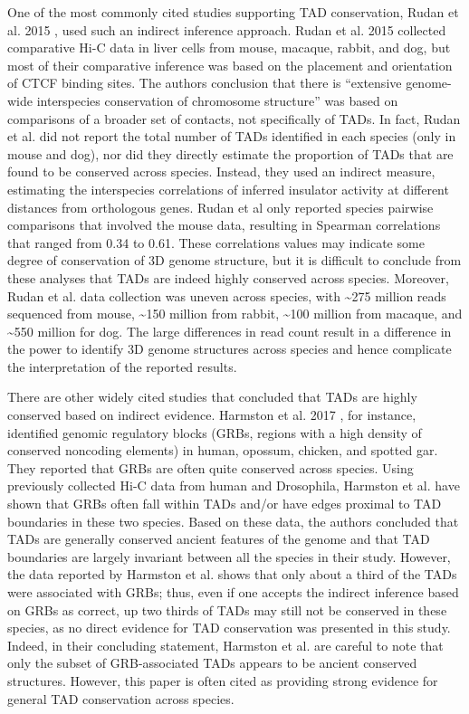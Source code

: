 One of the most commonly cited studies supporting TAD conservation, Rudan et al. 2015 \cite{Rudan.2015}, used such an indirect inference approach. Rudan et al. 2015 \cite{Rudan.2015} collected comparative Hi-C data in liver cells from mouse, macaque, rabbit, and dog, but most of their comparative inference was based on the placement and orientation of CTCF binding sites. The authors conclusion that there is ``extensive genome-wide interspecies conservation of chromosome structure'' was based on comparisons of a broader set of contacts, not specifically of TADs. In fact, Rudan et al. did not report the total number of TADs identified in each species (only in mouse and dog), nor did they directly estimate the proportion of TADs that are found to be conserved across species. Instead, they used an indirect measure, estimating the interspecies correlations of inferred insulator activity \cite{Sofueva.2013} at different distances from orthologous genes. Rudan et al only reported species pairwise comparisons that involved the mouse data, resulting in Spearman correlations that ranged from 0.34 to 0.61. These correlations values may indicate some degree of conservation of 3D genome structure, but it is difficult to conclude from these analyses that TADs are indeed highly conserved across species. Moreover, Rudan et al. data collection was uneven across species, with \textasciitilde{}275 million reads sequenced from mouse, \textasciitilde{}150 million from rabbit, \textasciitilde{}100 million from macaque, and \textasciitilde{}550 million for dog. The large differences in read count result in a difference in the power to identify 3D genome structures across species and hence complicate the interpretation of the reported results. 

There are other widely cited studies that concluded that TADs are highly conserved based on indirect evidence. Harmston et al. 2017 \cite{Harmston.2017}, for instance, identified genomic regulatory blocks (GRBs, regions with a high density of conserved noncoding elements) in human, opossum, chicken, and spotted gar. They reported that GRBs are often quite conserved across species. Using previously collected Hi-C data from human and Drosophila, Harmston et al. have shown that GRBs often fall within TADs and/or have edges proximal to TAD boundaries in these two species. Based on these data, the authors concluded that TADs are generally conserved ancient features of the genome and that TAD boundaries are largely invariant between all  the species in their study. However, the data reported by Harmston et al. shows that only about a third of the TADs were associated with GRBs; thus, even if one accepts the indirect inference based on GRBs as correct, up two thirds of TADs may still not be conserved in these species, as no direct evidence for TAD conservation was presented in this study. Indeed, in their concluding statement, Harmston et al. are careful to note that only the subset of GRB-associated TADs appears to be ancient conserved structures. However, this paper is often cited as providing strong evidence for general TAD conservation across species.  

